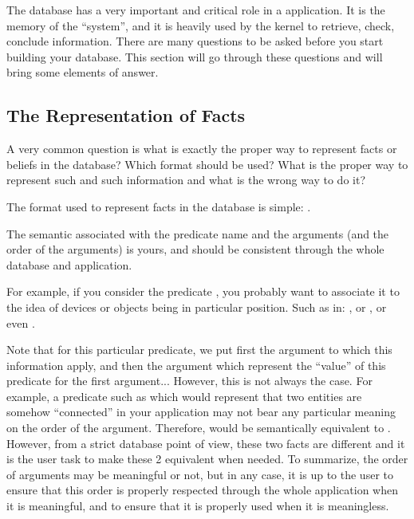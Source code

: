 The database has a very important and critical role in a \COPRS{}
application. It is the memory of the ``system'', and it is heavily used
by the kernel to retrieve, check, conclude information. There are many
questions to be asked before you start building your database. This
section will go through these questions and will bring some elements of
answer.



\subsection{The Representation of Facts}

A very common question is what is exactly the proper way to represent
facts or beliefs in the database? Which format should be used? What is
the proper way to represent such and such information and what is the
wrong way to do it?

The format used to represent facts in the database is simple: \*
.

The semantic associated with the predicate name and the arguments (and
the order of the arguments) is yours, and should be consistent through
the whole database and application.

For example, if you consider the predicate , you probably
want to associate it to the idea of devices or objects being in
particular position. Such as in: , or
, or even .

Note that for this particular predicate, we put first the argument to which
this information apply, and then the argument which represent the ``value''
of this predicate for the first argument... However, this is not always
the case. For example, a predicate such as  which would
represent that two entities are somehow ``connected'' in your application
may not bear any particular meaning on the order of the argument.
Therefore,  would be semantically equivalent to
. However, from a strict database point of view,
these two facts are different and it is the user task to make these 2
equivalent when needed. To summarize, the order of arguments may be
meaningful or not, but in any case, it is up to the user to ensure that
this order is properly respected through the whole application when it is
meaningful, and to ensure that it is properly used when it is meaningless.

